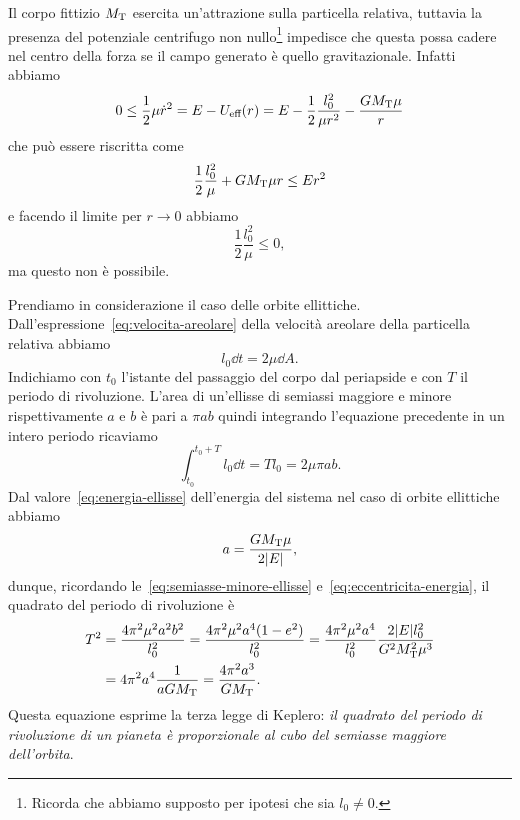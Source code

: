 {Il corpo fittizio $M_\textup{T}$ esercita un'attrazione sulla particella
relativa, tuttavia la presenza del potenziale centrifugo non
nullo\footnote{Ricorda che abbiamo supposto per ipotesi che sia $l_0\neq 0$.}
impedisce che questa possa cadere nel centro della forza se il campo generato è
quello gravitazionale. Infatti abbiamo
\begin{equation}
  0\leq \frac{1}{2}\mu\dot{r}^2 = E - U_\textup{eff}(r) = E -
  \frac{1}{2}\frac{l_0^2}{\mu r^2} - \frac{GM_\textup{T}\mu}{r}
\end{equation}
che può essere riscritta come
\begin{equation}
  \frac{1}{2}\frac{l_0^2}{\mu} + GM_\textup{T}\mu r \leq Er^2
\end{equation}
e facendo il limite per $r \to 0$ abbiamo
\begin{equation}
  \frac{1}{2}\frac{l_0^2}{\mu} \leq 0,
\end{equation}
ma questo non è possibile.

Prendiamo in considerazione il caso delle orbite
ellittiche. Dall'espressione~\eqref{eq:velocita-areolare} della velocità
areolare della particella relativa abbiamo
\begin{equation}
  l_0 \dd t = 2\mu\dd A.
\end{equation}
Indichiamo con $t_0$ l'istante del passaggio del corpo dal periapside e con $T$
il periodo di rivoluzione. L'area di un'ellisse di semiassi maggiore e minore
rispettivamente $a$ e $b$ è pari a $\pi ab$ quindi integrando l'equazione
precedente in un intero periodo ricaviamo
\begin{equation}
    \int_{t_0}^{t_0+T} l_0\dd t = Tl_0 = 2\mu\pi ab.
\end{equation}
Dal valore~\eqref{eq:energia-ellisse} dell'energia del sistema nel caso di
orbite ellittiche abbiamo
\begin{equation}
  a = \frac{GM_\textup{T}\mu}{2\lvert E\rvert},
\end{equation}
dunque, ricordando le~\eqref{eq:semiasse-minore-ellisse}
e~\eqref{eq:eccentricita-energia}, il quadrato del periodo di rivoluzione è
\begin{equation}
  \label{eq:terza-legge-keplero}
  \begin{split}
    T^2 &= \frac{4\pi^2\mu^2a^2b^2}{l_0^2} = \frac{4\pi^2\mu^2a^4(1-e^2)}{l_0^2}
    = \frac{4\pi^2\mu^2a^4}{l_0^2}\frac{2\lvert E\rvert l_0^2}{G^2M_\textup{T}^2\mu^3} \\
    &= 4\pi^2a^4\frac{1}{aGM_\textup{T}} = \frac{4\pi^2a^3}{GM_\textup{T}}.
  \end{split}
\end{equation}
Questa equazione esprime la terza legge di Keplero: \emph{il quadrato del
  periodo di rivoluzione di un pianeta è proporzionale al cubo del semiasse
  maggiore dell'orbita}.

}
